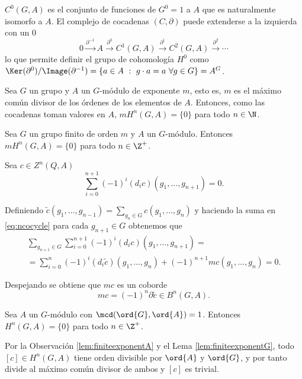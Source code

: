\begin{observacion}
	$C^0(G,A)$ es el conjunto de funciones de $G^0=1$ a $A$ que es naturalmente isomorfo a $A$. El complejo de cocadenas $(C,\partial)$ puede extenderse a la izquierda con un $0$
	\begin{equation*}
		0 \xrightarrow{\partial^{-1}} A \xrightarrow{\partial^0} C^{1}(G,A) \xrightarrow{\partial^1} C^2(G,A) \xrightarrow{\partial^2} \cdots
	\end{equation*}
	lo que permite definir el grupo de cohomología $H^0$ como $\Ker(\partial^0)/\Image(\partial^{-1}) = \{a\in A \ : \ g\cdot a = a \ \forall g\in G \} = A^G$.
\end{observacion}


\begin{observacion}\label{lem:finiteexponentA}
	Sea $G$ un grupo y $A$ un $G$-módulo de exponente $m$, esto es, $m$ es el máximo común divisor de los órdenes de los elementos de $A$. Entonces, como las cocadenas toman valores en $A$, $mH^n(G,A)=\{0\}$ para todo $n\in\N$.
\end{observacion}
	

\begin{lema}\label{lem:finiteexponentG}
	Sea $G$ un grupo finito de orden $m$ y $A$ un $G$-módulo. Entonces $mH^n(G,A)=\{0\}$ para todo $n \in \Z^+$.
	\begin{demostracion}
		Sea $c\in Z^n(Q,A)$
		\begin{equation}\label{eq:ncocycle}
			\sum\limits_{i=0}^{n+1} (-1)^i(d_ic)(g_1,\ldots,g_{n+1}) = 0.
		\end{equation}
		
		Definiendo $\tilde c(g_1,\hdots,g_{n-1}) = {\displaystyle \sum_{g_n\in G} c(g_1,\hdots,g_{n})}$ y haciendo la suma en \eqref{eq:ncocycle} para cada $g_{n+1} \in G$ obtenemos que
		\begin{multline*}
			\sum\limits_{g_{n+1}\in G}\sum\limits_{i=0}^{n+1} (-1)^i(d_ic)(g_1,\ldots,g_{n+1}) = \\ 
			= \sum\limits_{i=0}^{n} (-1)^i(d_i\tilde c)(g_1,\ldots,g_n) + (-1)^{n+1}m c(g_1,\ldots,g_n) = 0.
		\end{multline*}
		
		Despejando se obtiene que $mc$ es un coborde $$mc = (-1)^n \partial \tilde c \in B^n(G,A).$$
	\end{demostracion} 
\end{lema}

\begin{teorema}\label{thm:trivialH}
	Sea $A$ un $G$-módulo con $\mcd(\ord{G}, \ord{A}) = 1$. Entonces $H^n(G,A)=\{0\}$ para todo $n\in\Z^+$.
	\begin{demostracion}
		Por la Observación \ref{lem:finiteexponentA} y el Lema \ref{lem:finiteexponentG}, todo $[c]\in H^n(G,A)$ tiene orden divisible por $\ord{A}$ y $\ord{G}$, y por tanto divide al máximo común divisor de ambos y $[c]$ es trivial.
	\end{demostracion}
\end{teorema}

